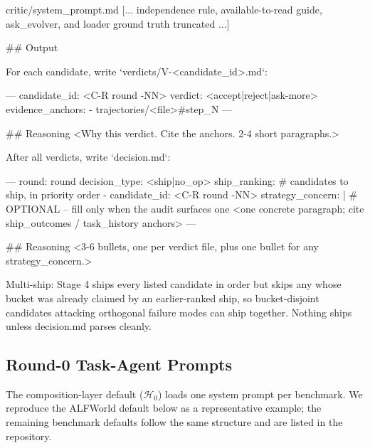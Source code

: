 \begin{promptfile}{critic/system\_prompt.md}
[... independence rule, available-to-read guide, ask_evolver, and loader ground
truth truncated ...]

## Output

For each candidate, write `verdicts/V-<candidate_id>.md`:

---
candidate_id: <C-R{{ round }}-NN>
verdict: <accept|reject|ask-more>
evidence_anchors:
  - trajectories/<file>#step_N
---

## Reasoning
<Why this verdict. Cite the anchors. 2-4 short paragraphs.>

After all verdicts, write `decision.md`:

---
round: {{ round }}
decision_type: <ship|no_op>
ship_ranking:                # candidates to ship, in priority order
  - candidate_id: <C-R{{ round }}-NN>
strategy_concern: |          # OPTIONAL -- fill only when the audit surfaces one
  <one concrete paragraph; cite ship_outcomes / task_history anchors>
---

## Reasoning
<3-6 bullets, one per verdict file, plus one bullet for any strategy_concern.>

Multi-ship: Stage 4 ships every listed candidate in order but skips any whose
bucket was already claimed by an earlier-ranked ship, so bucket-disjoint
candidates attacking orthogonal failure modes can ship together. Nothing ships
unless decision.md parses cleanly.
\end{promptfile}

\subsection{Round-0 Task-Agent Prompts}
\label{app:task-prompts}

The composition-layer default ($\mathcal{H}_0$) loads one system prompt per benchmark. We reproduce
the ALFWorld default below as a representative example; the remaining
benchmark defaults follow the same structure and are listed in the repository.



